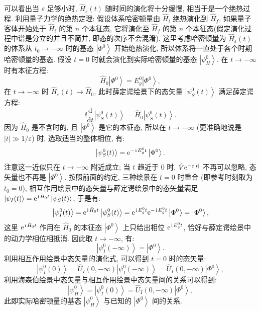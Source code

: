 可以看出当 $\varepsilon$ 足够小时, $\hat{H}_{\varepsilon}(t)$ 随时间的演化将十分缓慢, 相当于是一个绝热过程. 利用量子力学的绝热定理: 假设体系哈密顿量由 $\hat{H}_{i}$ 绝热演化到 $\hat{H}_{f}$, 如果量子客体开始处于 $\hat{H}_{i}$ 的第 $n$ 个本征态, 它将演化至 $\hat{H}_{f}$ 的第 $n$ 个本征态(假定演化过程中谱是分立的并且不简并, 即态的次序不会混淆). 这里考虑哈密顿量为 $\hat{H}_{\varepsilon}(t)$ 的体系从 $t_{0} \rightarrow-\infty$ 时的基态 $\left|\Phi^{0}\right\rangle$ 开始绝热演化, 所以体系将一直处于各个时期哈密顿量的基态. 假设 $t=0$ 时就会演化到实际哈密顿量的基态 $\left|\psi_{H}^{0}\right\rangle$. 在 $t \rightarrow-\infty$ 时有本征方程:
\begin{equation}
\hat{H}_{0}\left|\Phi^{0}\right\rangle=E_{g}^{0}\left|\Phi^{0}\right\rangle ,
\end{equation}
在 $t\rightarrow-\infty$ 时 $\hat{H}_{\varepsilon}(t)\rightarrow\hat{H}_{0}$, 此时薛定谔绘景下的态矢量 $\left|\psi_{S}^{0}(t)\right\rangle$ 满足薛定谔方程:
\begin{equation}
\ii \frac{\mathrm{d}}{\mathrm{d} t}\left|\psi_{S}^{0}(t)\right\rangle=\hat{H}_{0}\left|\psi_{S}^{0}(t)\right\rangle .
\end{equation}
因为 $\hat{H}_{0}$ 是不含时的, 且 $\left|\Phi^{0}\right\rangle$ 是它的本征态, 所以在 $t\rightarrow-\infty$ (更准确地说是 $|t|\gg 1/\varepsilon$) 时, 选取适当的整体相位, 有:
\begin{equation}
\left|\psi_{S}^{0}(t)\right\rangle=\mathrm{e}^{-\hspace{0.1em}\mathrm{i}\hspace{0.1em} E_{g}^{0}t}\left|\Phi^{0}\right\rangle .
\end{equation}
注意这一近似只在 $t\rightarrow-\infty$ 附近成立; 当 $t$ 趋近于 $0$ 时, $\hat{V}\mathrm{e}^{-\varepsilon|t|}$ 不再可以忽略, 态矢量也不再是 $\left|\Phi^{0}\right\rangle$. 按照前面的约定, 三种绘景在 $t=0$ 时重合 (即参考时刻取为 $t_{0}=0$), 相互作用绘景中的态矢量与薛定谔绘景中的态矢量满足 $\left|\psi_{I}(t)\right\rangle=\mathrm{e}^{\hspace{0.1em}\mathrm{i}\hspace{0.1em}\hat{H}_{0}t}\left|\psi_{S}(t)\right\rangle$, 于是有:
\begin{equation}
\left|\psi_{I}^{0}(t)\right\rangle=\mathrm{e}^{\hspace{0.1em}\mathrm{i}\hspace{0.1em} \hat{H}_{0}t}\left|\psi_{S}^{0}(t)\right\rangle=\mathrm{e}^{\hspace{0.1em}\mathrm{i}\hspace{0.1em} E_{g}^{0}t}\mathrm{e}^{-\hspace{0.1em}\mathrm{i}\hspace{0.1em} E_{g}^{0}t}\left|\Phi^{0}\right\rangle=\left|\Phi^{0}\right\rangle ,
\end{equation}
这里 $\mathrm{e}^{\hspace{0.1em}\mathrm{i}\hspace{0.1em}\hat{H}_{0}t}$ 作用在 $\hat{H}_{0}$ 的本征态 $\left|\Phi^{0}\right\rangle$ 上只给出相位 $\mathrm{e}^{\hspace{0.1em}\mathrm{i}\hspace{0.1em} E_{g}^{0}t}$, 恰好与薛定谔绘景中的动力学相位相抵消. 因此取 $t\rightarrow-\infty$, 有:
\begin{equation}
\left|\psi_{I}^{0}(-\infty)\right\rangle=\left|\Phi^{0}\right\rangle .
\end{equation}
利用相互作用绘景中态矢量的演化式, 可以得到 $t=0$ 时的态矢量:
\begin{equation}
\left|\psi_{I}^{0}(0)\right\rangle=\hat U_I(0,-\infty)\left|\psi_{I}^{0}(-\infty)\right\rangle=\hat U_I(0,-\infty)\left|\Phi^{0}\right\rangle,
\end{equation}
利用海森伯绘景中态矢量与相互作用绘景中态矢量间的关系可以得到:
\begin{equation}
\left|\psi_{H}^{0}\right\rangle=\left|\psi_{I}^{0}(0)\right\rangle=\hat U_I(0,-\infty)\left|\Phi^{0}\right\rangle ,
\end{equation}
此即实际哈密顿量的基态 $\left|\psi_{H}^{0}\right\rangle$ 与已知的 $\left|\Phi^{0}\right\rangle$ 间的关系. 

